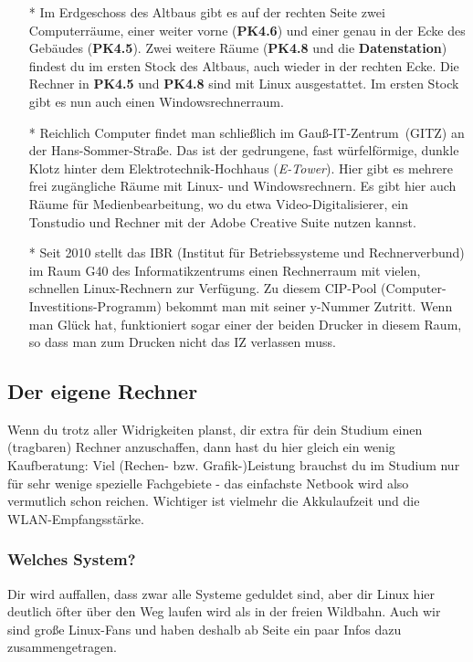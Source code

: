 			\begin{itemize}
				\item[*] Im Erdgeschoss des Altbaus gibt es auf der rechten Seite zwei Computerräume, einer weiter vorne (\textbf{PK4.6}) und einer genau in der Ecke des Gebäudes (\textbf{PK4.5}). Zwei weitere Räume (\textbf{PK4.8} und die \textbf{Datenstation}) findest du im ersten Stock des Altbaus, auch wieder in der rechten Ecke. Die Rechner in \textbf{PK4.5} und \textbf{PK4.8} sind mit Linux ausgestattet. Im ersten Stock gibt es nun auch einen Windowsrechnerraum.

				\item[*] Reichlich Computer findet man schließlich im Gauß-IT-Zentrum~(GITZ) an der Hans-Sommer-Straße. Das ist der gedrungene, fast würfelförmige, dunkle Klotz hinter dem Elektrotechnik-Hochhaus (\emph{E-Tower}). Hier gibt es mehrere frei zugängliche Räume mit Linux- und Windowsrechnern. Es gibt hier auch Räume für Medienbearbeitung, wo du etwa Video-Digitalisierer, ein Tonstudio und Rechner mit der Adobe Creative Suite nutzen kannst.

				\item[*] Seit 2010 stellt das IBR (Institut für Betriebssysteme und Rechnerverbund) im Raum G40 des Informatikzentrums einen Rechnerraum mit vielen, schnellen Linux-Rechnern  zur Verfügung. Zu diesem CIP-Pool (Computer-Investitions-Programm) bekommt man mit seiner y-Nummer Zutritt. Wenn man Glück hat, funktioniert sogar einer der beiden Drucker in diesem Raum, so dass man zum Drucken nicht das IZ verlassen muss.
			\end{itemize}

		\subsection{Der eigene Rechner}
			Wenn du trotz aller Widrigkeiten planst, dir extra für dein Studium einen (tragbaren) Rechner anzuschaffen, dann hast du hier gleich ein wenig Kaufberatung: Viel (Rechen- bzw. Grafik-)Leistung brauchst du im Studium  nur für sehr wenige spezielle Fachgebiete - das einfachste Netbook wird also vermutlich schon reichen. Wichtiger ist vielmehr die Akkulaufzeit und die WLAN-Empfangsstärke.	

		\subsubsection{Welches System?}
			Dir wird auffallen, dass zwar alle Systeme geduldet sind, aber dir Linux hier deutlich öfter über den Weg laufen wird als in der freien Wildbahn. Auch wir sind große Linux-Fans und haben deshalb ab Seite \pageref{linux} ein paar Infos dazu zusammengetragen.

